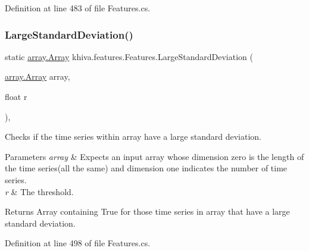 Definition at line 483 of file Features.\+cs.

\mbox{\label{classkhiva_1_1features_1_1_features_a70067042add15b9eb09cb155ba210b5d}} 
\subsubsection{\texorpdfstring{Large\+Standard\+Deviation()}{LargeStandardDeviation()}}
{\footnotesize\ttfamily static \mbox{\hyperlink{classkhiva_1_1array_1_1_array}{array.\+Array}} khiva.\+features.\+Features.\+Large\+Standard\+Deviation (\begin{DoxyParamCaption}\item[{\mbox{\hyperlink{classkhiva_1_1array_1_1_array}{array.\+Array}}}]{array,  }\item[{float}]{r }\end{DoxyParamCaption})\hspace{0.3cm}{\ttfamily [inline]}, {\ttfamily [static]}}



Checks if the time series within array have a large standard deviation. 


\begin{DoxyParams}{Parameters}
{\em array} & Expects an input array whose dimension zero is the length of the time series(all the same) and dimension one indicates the number of time series.\\
\hline
{\em r} & The threshold.\\
\hline
\end{DoxyParams}
\begin{DoxyReturn}{Returns}
Array containing True for those time series in array that have a large standard deviation.
\end{DoxyReturn}


Definition at line 498 of file Features.\+cs.

\mbox{\label{classkhiva_1_1features_1_1_features_a7131dcc52520fbddaf1e4906cda15423}} 
